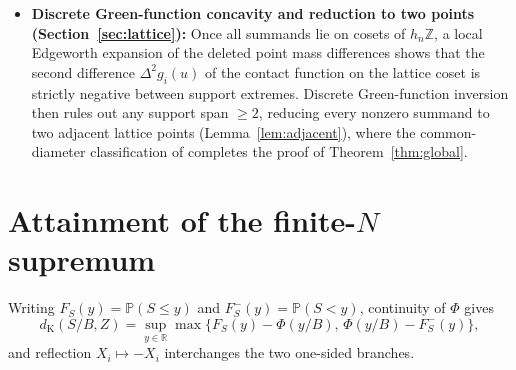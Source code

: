 \documentclass[11pt]{article}
\numberwithin{equation}{section}
\theoremstyle{remark}\newtheorem{remark}[theorem]{Remark}
\newcommand{\E}{\mathbb E}\newcommand{\Pp}{\mathbb P}
\newcommand{\R}{\mathbb R}\newcommand{\Z}{\mathbb Z}
\begin{document}
\begin{itemize}[leftmargin=2em]
which implies $Q=o(t)$ whenever $t=\E|T|>0$. Rescaling slightly to place the
full characteristic product at an exact local maximum at frequency $2\pi$
gives $|\Cov(K,T)|\le KHQ$ (Lemma~\ref{lem:full-peak}). Using a Khintchine
truncation multiplier bound (Lemma~\ref{lem:multiplier}) and a two-copy
conditional Fourier expansion, Lemma~\ref{lem:conditional-relative} proves
the \emph{relative} conditional first-moment bounds
$ct\le\E(|T|\mid K=k)\le Kt$ and $|\E(T\mid K=k)|=o(t)$, valid even if
$t=\E|T|$ tends to zero arbitrarily fast. Replacing $Y_i=J_i+Z_i$ by the
pure lattice summands $J_i$ at the same $N$ then increases the Berry--Esseen
ratio by at least $c't$ whenever $t>0$, forcing $t=0$ and hence $Z_i=0$
almost surely for every $i$ (Proposition~\ref{prop:collapse}).
\item \textbf{Discrete Green-function concavity and reduction to two points
(Section~\ref{sec:lattice}):} Once all summands lie on cosets of $h_n\Z$, a
local Edgeworth expansion of the deleted point mass differences shows that
the second difference $\Delta^2g_i(u)$ of the contact function on the lattice
coset is strictly negative between support extremes. Discrete Green-function
inversion then rules out any support span $\ge2$, reducing every nonzero
summand to two adjacent lattice points (Lemma~\ref{lem:adjacent}), where the
common-diameter classification of \citet[Theorem~1.1]{BellBernoulli2026}
completes the proof of Theorem~\ref{thm:global}.
\end{itemize}

\section{Attainment of the finite-\texorpdfstring{$N$}{N} supremum}\label{sec:finite}

Writing $F_S(y)=\Pp(S\le y)$ and $F_S^-(y)=\Pp(S<y)$, continuity of $\Phi$
gives
\begin{equation}\label{eq:branches}
 d_{\mathrm K}(S/B,Z)=\sup_{y\in\R}\max\bigl\{F_S(y)-\Phi(y/B),\,
                                  \Phi(y/B)-F_S^-(y)\bigr\},
\end{equation}
and reflection $X_i\mapsto-X_i$ interchanges the two one-sided branches.
\end{document}
